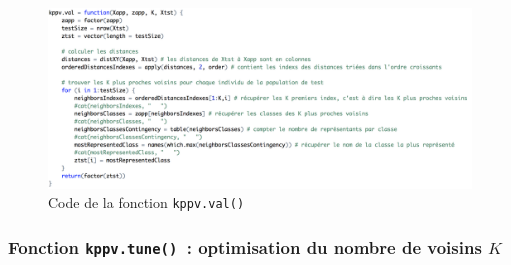 \documentclass[a4paper,10pt]{report}
\begin{document}
\begin{figure}[H]
	\centering
	\captionsetup{justification=centering, margin=4cm}
	\includegraphics[width=.9\linewidth]{img/1-1-2-kppv-val-code}
	\caption{\small Code de la fonction \texttt{kppv.val()}}	
	\label{fig:1-1-2-kppv-val-code}%
\end{figure}


\subsubsection{Fonction \texttt{kppv.tune()}~: optimisation du nombre de voisins $K$}
\end{document}

